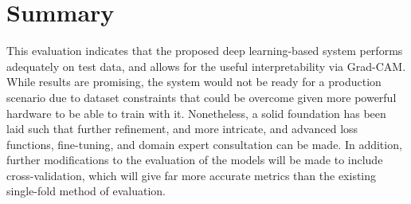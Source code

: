 \documentclass[../main]{subfiles}
\begin{document}
\section{Summary}
\label{sec:summary}
This evaluation indicates that the proposed deep learning-based system performs adequately on test data, and allows for the useful interpretability via Grad-CAM. While results are promising, the system would not be ready for a production scenario due to dataset constraints that could be overcome given more powerful hardware to be able to train with it. Nonetheless, a solid foundation has been laid such that further refinement, and more intricate, and advanced loss functions, fine-tuning, and domain expert consultation can be made. In addition, further modifications to the evaluation of the models will be made to include cross-validation, which will give far more accurate metrics than the existing single-fold method of evaluation.
\end{document}
